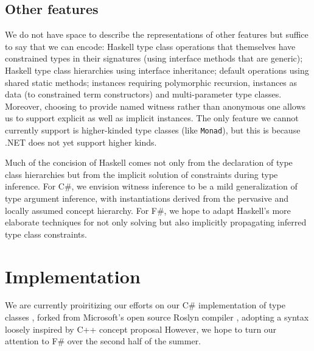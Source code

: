 \documentclass[preprint]{sig-alternate-05-2015}
\begin{document}
\subsection{Other features}

We do not have space to describe the representations of other features but suffice to say that we can encode:
Haskell type class operations that themselves have constrained types in their signatures (using interface methods that are generic);
Haskell type class hierarchies  using interface inheritance; default operations using shared static methods; instances requiring 
polymorphic recursion, instances as data (to constrained term constructors) and multi-parameter type classes. Moreover, choosing to provide named witness rather than anonymous one allows us to support
explicit as well as implicit instances.
The only feature we cannot currently support is higher-kinded type classes (like \lstinline{Monad}), but this is because .NET does not yet support higher kinds.

Much of the concision of Haskell comes not only from the declaration of type class hierarchies but from the implicit solution of constraints during type inference.
For C\#, we envision witness inference to be a mild generalization of type argument inference, with instantiations derived from the pervasive and locally assumed concept hierarchy.
For F\#, we hope to adapt Haskell's more elaborate techniques for not only solving but also implicitly propagating inferred type class constraints.
\section{Implementation}

We are currently proiritizing our efforts on our C\# implementation of type classes \cite{Roslynfork}, forked from Microsoft's open source Roslyn compiler \cite{Roslyn}, adopting a syntax loosely inspired by C++ concept proposal 
However, we hope to turn our attention to F\# over the second half of the summer.


 
\end{document}
